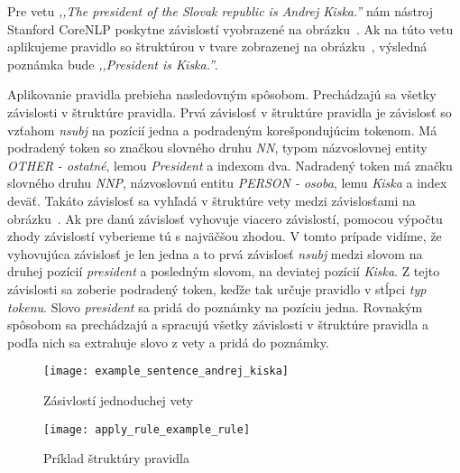 Pre vetu \textit{,,The president of the Slovak republic is Andrej Kiska.''} nám nástroj Stanford CoreNLP poskytne závislostí vyobrazené na obrázku~. Ak na túto vetu aplikujeme pravidlo so štruktúrou v tvare zobrazenej na obrázku~, výsledná poznámka bude \textit{,,President is Kiska.''}. 

Aplikovanie pravidla prebieha nasledovným spôsobom. Prechádzajú sa všetky závislosti v štruktúre pravidla. Prvá závislosť v štruktúre pravidla je závislosť so vzťahom \textit{nsubj} na pozícií jedna a podradeným korešpondujúcim tokenom. Má podradený token so značkou slovného druhu \textit{NN}, typom názvoslovnej entity \textit{OTHER - ostatné}, lemou \textit{President} a indexom dva. Nadradený token má značku slovného druhu \textit{NNP}, názvoslovnú entitu \textit{PERSON - osoba}, lemu \textit{Kiska} a index deväť. Takáto závislosť sa vyhľadá v štruktúre vety medzi závislosťami na obrázku~. Ak pre danú závislosť vyhovuje viacero závislostí, pomocou výpočtu zhody závislostí vyberieme tú s najväčšou zhodou. V tomto prípade vidíme, že vyhovujúca závislosť je len jedna a to prvá závislosť \textit{nsubj} medzi slovom na druhej pozícií \textit{president} a posledným slovom, na deviatej pozícií \textit{Kiska}. Z tejto závislosti sa zoberie podradený token, keďže tak určuje pravidlo v stĺpci \textit{typ tokenu}. Slovo \textit{president} sa pridá do poznámky na pozíciu jedna. Rovnakým spôsobom sa prechádzajú a spracujú všetky závislosti v štruktúre pravidla a podľa nich sa extrahuje slovo z vety a pridá do poznámky.

\begin{figure}[H]
	\begin{center}\texttt{[image: example\_sentence\_andrej\_kiska]}\end{center}
	\caption[Zásivlostí jednoduchej vety]{Zásivlostí jednoduchej vety}\label{fig:example_sentence_andrej_kiska}
\end{figure}

\begin{figure}[H]
	\begin{center}\texttt{[image: apply\_rule\_example\_rule]}\end{center}
	\caption[Príklad štruktúry pravidla]{Príklad štruktúry pravidla}\label{fig:apply_rule_example_rule}
\end{figure}

